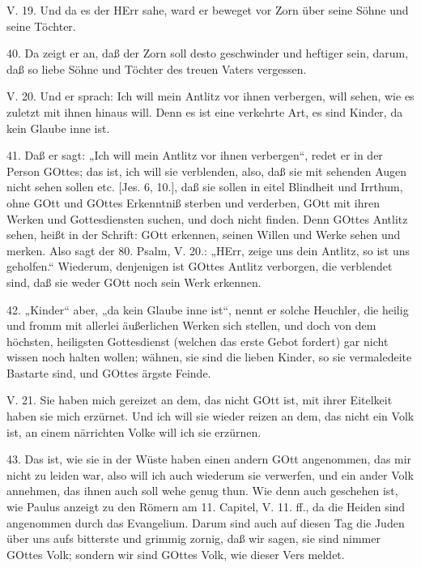 \begin{schriftzitat}
V. 19. Und da es der HErr sahe, ward er beweget vor Zorn über seine Söhne und seine Töchter.
\end{schriftzitat}

40. Da zeigt er an, daß der Zorn soll desto geschwinder und heftiger sein, darum, daß so liebe Söhne und Töchter des treuen Vaters vergessen.

\begin{schriftzitat}
V. 20. Und er sprach: Ich will mein Antlitz vor ihnen verbergen, will sehen, wie es zuletzt mit ihnen hinaus will. Denn es ist eine verkehrte Art, es sind Kinder, da kein Glaube inne ist.
\end{schriftzitat}

41. Daß er sagt: „Ich will mein Antlitz vor ihnen verbergen“, redet er in der Person GOttes; das ist, ich will sie verblenden, also, daß sie mit sehenden Augen nicht sehen sollen etc. [Jes. 6, 10.], daß sie sollen in eitel Blindheit und Irrthum, ohne GOtt und GOttes Erkenntniß sterben und verderben, GOtt mit ihren Werken und Gottesdiensten suchen, und doch nicht finden. Denn GOttes Antlitz sehen, heißt in der Schrift: GOtt erkennen, seinen Willen und Werke sehen und merken. Also sagt der 80. Psalm, V. 20.: „HErr, zeige uns dein Antlitz, so ist uns geholfen.“ Wiederum, denjenigen ist GOttes Antlitz verborgen, die verblendet sind, daß sie weder GOtt noch sein Werk erkennen.

42. „Kinder“ aber, „da kein Glaube inne ist“, nennt er solche Heuchler, die heilig und fromm mit allerlei äußerlichen Werken sich stellen, und doch von dem höchsten, heiligsten Gottesdienst (welchen das erste Gebot fordert) gar nicht wissen noch halten wollen; wähnen, sie sind die lieben Kinder, so sie vermaledeite Bastarte sind, und GOttes ärgste Feinde.

\begin{schriftzitat}
V. 21. Sie haben mich gereizet an dem, das nicht GOtt ist, mit ihrer Eitelkeit haben sie mich erzürnet. Und ich will sie wieder reizen an dem, das nicht ein Volk ist, an einem närrichten Volke will ich sie erzürnen.
\end{schriftzitat}

43. Das ist, wie sie in der Wüste haben einen andern GOtt angenommen, das mir nicht zu leiden war, also will ich auch wiederum sie verwerfen, und ein ander Volk annehmen, das ihnen auch soll wehe genug thun. Wie denn auch geschehen ist, wie Paulus anzeigt zu den Römern am 11. Capitel, V. 11. ff., da die Heiden sind angenommen durch das Evangelium. Darum sind auch auf diesen Tag die Juden über uns aufs bitterste und grimmig zornig, daß wir sagen, sie sind nimmer GOttes Volk; sondern wir sind GOttes Volk, wie dieser Vers meldet.

